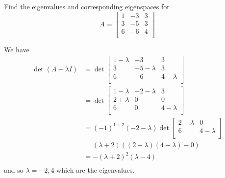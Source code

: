 \documentclass{article}
\begin{document}
\begin{example}
  Find the eigenvalues and corresponding eigenspaces for \[
    A =
    \begin{bmatrix}
      1 & -3 & 3 \\
      3 & -5 & 3 \\
      6 & -6 & 4 \\
    \end{bmatrix}
  \]

  We have
  \begin{align*}
    \det (A - \lambda I) & = \det
    \begin{bmatrix}
      1 - \lambda & -3           & 3           \\
      3           & -5 - \lambda & 3           \\
      6           & -6           & 4 - \lambda \\
    \end{bmatrix}                              \\
                         & = \det
    \begin{bmatrix}
      1 - \lambda & -2 - \lambda & 3           \\
      2 + \lambda & 0            & 0           \\
      6           & 0            & 4 - \lambda \\
    \end{bmatrix}                              \\
                         & = (-1)^{1 + 2}(-2 - \lambda)\det
    \begin{bmatrix}
      2 + \lambda & 0           \\
      6           & 4 - \lambda \\
    \end{bmatrix}                                             \\
                         & = (\lambda + 2)((2 + \lambda)(4- \lambda) - 0) \\
                         & = -(\lambda + 2)^2(\lambda - 4)                \\
  \end{align*} and so $\lambda = -2, 4$ which are the eigenvalues.


\end{example}
\end{document}
